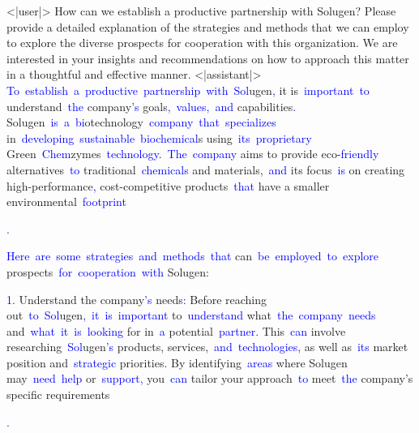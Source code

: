 \documentclass{article}
\begin{document}
\begin{tcolorbox}[colframe=black,colback=white]
<|user|>
How can we establish a productive partnership with Solugen? Please provide a detailed explanation of the strategies and methods that we can employ to explore the diverse prospects for cooperation with this organization. We are interested in your insights and recommendations on how to approach this matter in a thoughtful and effective manner.
<|assistant|>
\textcolor{blue}{To}\textcolor{blue}{~establish}\textcolor{blue}{~a}\textcolor{blue}{~productive}\textcolor{blue}{~partnership}\textcolor{blue}{~with}\textcolor{blue}{~Sol}ugen\textcolor{blue}{,} it is\textcolor{blue}{~important}\textcolor{blue}{~to} understand\textcolor{blue}{~the} company\textcolor{blue}{'s} goals\textcolor{blue}{,}\textcolor{blue}{~values}\textcolor{blue}{,}\textcolor{blue}{~and} capabilities\textcolor{blue}{.} Solugen\textcolor{blue}{~is}\textcolor{blue}{~a}\textcolor{blue}{~bi}otechnology\textcolor{blue}{~company}\textcolor{blue}{~that}\textcolor{blue}{~specializes} in\textcolor{blue}{~developing}\textcolor{blue}{~sustainable}\textcolor{blue}{~biochemical}s using\textcolor{blue}{~its}\textcolor{blue}{~proprietary} Green\textcolor{blue}{~Chem}zymes\textcolor{blue}{~technology}\textcolor{blue}{.}\textcolor{blue}{~The}\textcolor{blue}{~company} aims to provide eco\textcolor{blue}{-friendly} alternatives\textcolor{blue}{~to} traditional\textcolor{blue}{~chemicals} and materials,\textcolor{blue}{~and} its focus\textcolor{blue}{~is} on creating high-performance\textcolor{blue}{,} cost-competitive products\textcolor{blue}{~that} have a smaller environmental\textcolor{blue}{~footprint}\textcolor{blue}{.

}\textcolor{blue}{Here}\textcolor{blue}{~are}\textcolor{blue}{~some}\textcolor{blue}{~strategies}\textcolor{blue}{~and}\textcolor{blue}{~methods}\textcolor{blue}{~that} can\textcolor{blue}{~be}\textcolor{blue}{~employed}\textcolor{blue}{~to}\textcolor{blue}{~explore} prospects\textcolor{blue}{~for}\textcolor{blue}{~cooperation}\textcolor{blue}{~with} Solugen:

\textcolor{blue}{1}\textcolor{blue}{.} Understand the company\textcolor{blue}{'s} needs\textcolor{blue}{:} Before reaching out\textcolor{blue}{~to}\textcolor{blue}{~Sol}ugen\textcolor{blue}{,}\textcolor{blue}{~it}\textcolor{blue}{~is}\textcolor{blue}{~important} to\textcolor{blue}{~understand} what\textcolor{blue}{~the}\textcolor{blue}{~company}\textcolor{blue}{~needs} and\textcolor{blue}{~what}\textcolor{blue}{~it}\textcolor{blue}{~is}\textcolor{blue}{~looking} for in\textcolor{blue}{~a} potential\textcolor{blue}{~partner}\textcolor{blue}{.} This\textcolor{blue}{~can} involve researching\textcolor{blue}{~Sol}ugen\textcolor{blue}{'s} products, services,\textcolor{blue}{~and}\textcolor{blue}{~technologies}, as well as\textcolor{blue}{~its} market position and\textcolor{blue}{~strategic} priorities. By identifying\textcolor{blue}{~areas} where Solugen may\textcolor{blue}{~need}\textcolor{blue}{~help} or\textcolor{blue}{~support}\textcolor{blue}{,} you\textcolor{blue}{~can} tailor your approach\textcolor{blue}{~to} meet\textcolor{blue}{~the} company's specific requirements\textcolor{blue}{.

}
\end{tcolorbox}
\end{document}

